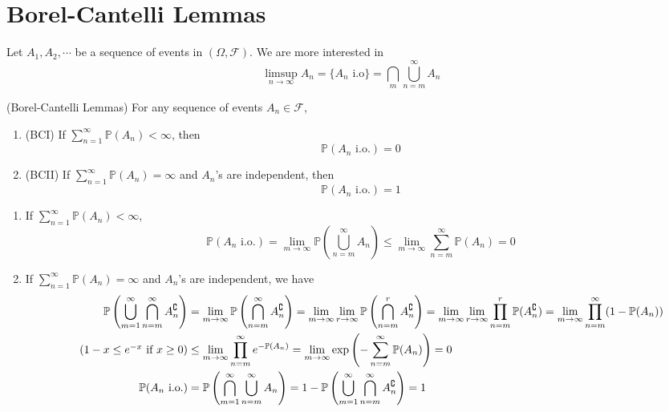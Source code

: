\documentclass{huhtakm-template-book}
\newcommand{\prob}{\mathbb{P}}
\begin{document}
\section{Borel-Cantelli Lemmas}
Let $A_{1},A_{2},\cdots$ be a sequence of events in $(\Omega,\mathcal{F})$. We are more interested in
\begin{equation*}
	\limsup_{n\to\infty}A_{n}=\{A_{n}\text{ i.o}\}=\bigcap_{m}\bigcup_{n=m}^{\infty} A_{n}
\end{equation*}
\begin{thm}(Borel-Cantelli Lemmas)
	For any sequence of events $A_{n}\in\mathcal{F}$,
	\begin{enumerate}
		\item (BCI) If $\sum_{n=1}^{\infty}\prob(A_{n})<\infty$, then
		\begin{equation*}
			\prob(A_{n}\text{ i.o.})=0
		\end{equation*}
		\item (BCII) If $\sum_{n=1}^{\infty}\prob(A_{n})=\infty$ and $A_{n}$'s are independent, then
		\begin{equation*}
			\prob(A_{n}\text{ i.o.})=1
		\end{equation*}
	\end{enumerate}
\end{thm}
\begin{proofing}
	\begin{enumerate}
		\item If $\sum_{n=1}^{\infty}\prob(A_{n})<\infty$,
		\begin{equation*}
			\prob(A_{n}\text{ i.o.})=\lim_{m\to\infty}\prob\left(\bigcup_{n=m}^{\infty}A_{n}\right)\leq\lim_{m\to\infty}\sum_{n=m}^{\infty}\prob(A_{n})=0
		\end{equation*}
		\item If $\sum_{n=1}^{\infty}\prob(A_{n})=\infty$ and $A_{n}$'s are independent, we have
		\begin{align*}
			\prob\left(\bigcup_{m=1}^{\infty}\bigcap_{n=m}^{\infty}A_{n}^{\complement}\right)&=\lim_{m\to\infty}\prob\left(\bigcap_{n=m}^{\infty}A_{n}^{\complement}\right)=\lim_{m\to\infty}\lim_{r\to\infty}\prob\left(\bigcap_{n=m}^{r}A_{n}^{\complement}\right)=\lim_{m\to\infty}\lim_{r\to\infty}\prod_{n=m}^{r}\prob(A_{n}^{\complement})=\lim_{m\to\infty}\prod_{n=m}^{\infty}(1-\prob(A_{n}))\\
			\tag{$1-x\leq e^{-x}$ if $x\geq 0$}
			&\leq\lim_{m\to\infty}\prod_{n=m}^{\infty}e^{-\prob(A_{n})}=\lim_{m\to\infty}\exp\left(-\sum_{n=m}^{\infty}\prob(A_{n})\right)=0\\
			\prob(A_{n}\text{ i.o.})&=\prob\left(\bigcap_{m=1}^{\infty}\bigcup_{n=m}^{\infty}A_{n}\right)=1-\prob\left(\bigcup_{m=1}^{\infty}\bigcap_{n=m}^{\infty}A_{n}^{\complement}\right)=1
		\end{align*}
	\end{enumerate}
\end{proofing}
\end{document}
